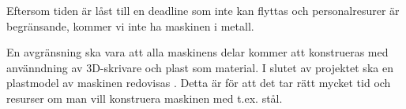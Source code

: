 Eftersom tiden är låst till en deadline som inte kan flyttas och personalresurer är begränsande,
kommer vi inte ha maskinen i metall.

En avgränsning ska vara att alla maskinens delar kommer att konstrueras med använndning av 3D-skrivare och plast som material. I slutet av projektet ska en plastmodel av maskinen redovisas . Detta är för att det tar rätt mycket tid och resurser om man vill konstruera maskinen med t.ex. stål.
